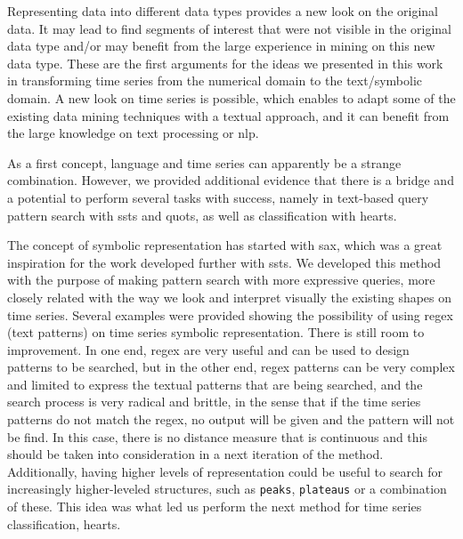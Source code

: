 Representing data into different data types provides a new look on the original data. It may lead to find segments of interest that were not visible in the original data type and/or may benefit from the large experience in mining on this new data type. These are the first arguments for the ideas we presented in this work in transforming time series from the numerical domain to the text/symbolic domain. A new look on time series is possible, which enables to adapt some of the existing data mining techniques with a textual approach, and it can benefit from the large knowledge on text processing or \gls{nlp}.
\par
As a first concept, language and time series can apparently be a strange combination. However, we provided additional evidence that there is a bridge and a potential to perform several tasks with success, namely in text-based query pattern search with \gls{ssts} and \gls{quots}, as well as classification with \gls{hearts}. 
\par
The concept of symbolic representation has started with \gls{sax}, which was a great inspiration for the work developed further with \gls{ssts}. We developed this method with the purpose of making pattern search with more expressive queries, more closely related with the way we look and interpret visually the existing shapes on time series. Several examples were provided showing the possibility of using \gls{regex} (text patterns) on time series symbolic representation. There is still room to improvement. In one end, \gls{regex} are very useful and can be used to design patterns to be searched, but in the other end, \gls{regex} patterns can be very complex and limited to express the textual patterns that are being searched, and the search process is very radical and brittle, in the sense that if the time series patterns do not match the \gls{regex}, no output will be given and the pattern will not be find. In this case, there is no distance measure that is continuous and this should be taken into consideration in a next iteration of the method. Additionally, having higher levels of representation could be useful to search for increasingly higher-leveled structures, such as \texttt{peaks}, \texttt{plateaus} or a combination of these. This idea was what led us perform the next method for time series classification, \gls{hearts}. 
\par

